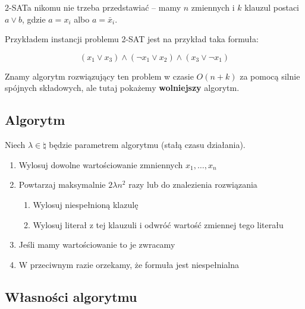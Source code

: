 2-SATa nikomu nie trzeba przedstawiać -- mamy \( n \) zmiennych i \( k \) klauzul postaci \( a \lor b \), gdzie \( a = x_i \) albo \( a = \bar x_i \).

Przykładem instancji problemu 2-SAT jest na przykład taka formuła:

\[
	(x_1 \lor x_3) \land (\neg x_1 \lor x_2) \land (x_3 \lor \neg x_1)
\]

Znamy algorytm rozwiązujący ten problem w czasie \( O(n + k) \) za pomocą silnie spójnych składowych, ale tutaj pokażemy \textbf{wolniejszy} algorytm.

\subsection{Algorytm}
\label{2-sat-algorithm}
Niech \( \lambda \in \natural \) będzie parametrem algorytmu (stałą czasu działania).
\begin{enumerate}
	\item Wylosuj dowolne wartościowanie zmniennych \( x_1, \dots, x_n \)
	\item Powtarzaj maksymalnie \( 2\lambda n^2 \) razy lub do znalezienia rozwiązania
	      \begin{enumerate}
		      \item Wylosuj niespełnioną klazulę
		      \item Wylosuj literał z tej klauzuli i odwróć wartość zmiennej tego literału
	      \end{enumerate}
	\item Jeśli mamy wartościowanie to je zwracamy
	\item W przeciwnym razie orzekamy, że formuła jest niespełnialna
\end{enumerate}

\subsection{Własności algorytmu}

